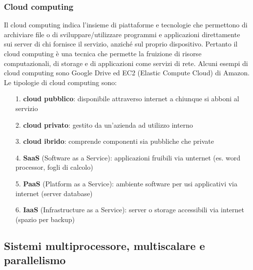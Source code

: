 \documentclass[a4paper]{article}
\begin{document}
\subsubsection*{Cloud computing}
Il cloud computing indica l'insieme di piattaforme e tecnologie che permettono di archiviare file o di sviluppare/utilizzare
programmi e applicazioni direttamente sui server di chi fornisce il servizio, anziché sul proprio dispositivo. Pertanto il cloud
computing è una tecnica che permette la fruizione di risorse computazionali, di storage e di applicazioni come servizi di rete.
Alcuni esempi di cloud computing sono Google Drive ed EC2 (Elastic Compute Cloud) di Amazon. Le tipologie di cloud computing sono:
\begin{itemize}
	\item[1.] \textbf{cloud pubblico}: disponibile attraverso internet a chiunque si abboni al servizio
	\item[2.] \textbf{cloud privato}: gestito da un’azienda ad utilizzo interno
	\item[3.] \textbf{cloud ibrido}: comprende componenti sia pubbliche che private
	\item[4.] \textbf{SaaS} (Software as a Service): applicazioni fruibili via unternet (es. word processor, fogli di calcolo)
	\item[5.] \textbf{PaaS} (Platform as a Service): ambiente software per usi applicativi via internet (server database)
	\item[6.] \textbf{IaaS} (Infrastructure as a Service): server o storage accessibili via internet (spazio per backup)
\end{itemize}



\subsection{Sistemi multiprocessore, multiscalare e parallelismo}
\end{document}
